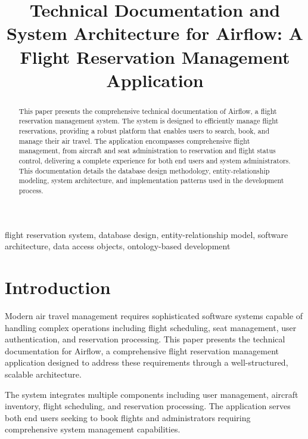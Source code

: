 \documentclass[conference]{IEEEtran}
\begin{document}
    \title{Technical Documentation and System Architecture for Airflow: A Flight Reservation Management Application}

    \author{
    }

    \maketitle

    \begin{abstract}
        This paper presents the comprehensive technical documentation of Airflow, a flight reservation management system. The system is designed to efficiently manage flight reservations, providing a robust platform that enables users to search, book, and manage their air travel. The application encompasses comprehensive flight management, from aircraft and seat administration to reservation and flight status control, delivering a complete experience for both end users and system administrators. This documentation details the database design methodology, entity-relationship modeling, system architecture, and implementation patterns used in the development process.
    \end{abstract}

    \begin{IEEEkeywords}
        flight reservation system, database design, entity-relationship model, software architecture, data access objects, ontology-based development
    \end{IEEEkeywords}

    \section{Introduction}
    Modern air travel management requires sophisticated software systems capable of handling complex operations including flight scheduling, seat management, user authentication, and reservation processing. This paper presents the technical documentation for Airflow, a comprehensive flight reservation management application designed to address these requirements through a well-structured, scalable architecture.

    The system integrates multiple components including user management, aircraft inventory, flight scheduling, and reservation processing. The application serves both end users seeking to book flights and administrators requiring comprehensive system management capabilities.
\end{document}
